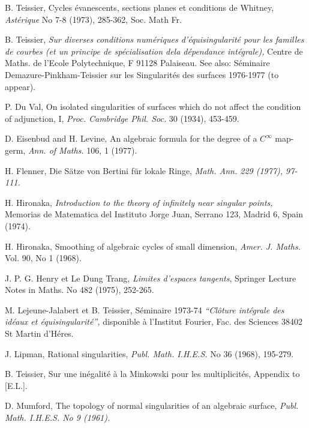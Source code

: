 \begin{thebibliography}{99}
 B. Teissier, Cycles \'evanescents, sections planes et conditions de Whitney, {\em Ast\'erique } No 7-8 (1973), 285-362, Soc. Math Fr.

 B. Teissier, {\em Sur diverses conditions num\'eriques d'\'equisingularit\'e pour les familles de courbes (et un principe de sp\'ecialisation de\pageoriginale la d\'ependance int\'egrale),} Centre de Maths. de l'Ecole Polytechnique, F 91128 Palaiseau. See also: S\'eminaire Demazure-Pinkham-Teissier sur les Singularit\'es des surfaces 1976-1977 (to appear).

 P. Du Val, On isolated singularities of surfaces which do not affect the condition of adjunction, I, {\em Proc. Cambridge Phil. Soc. }  30 (1934), 453-459.


 D. Eisenbud and H. Levine, An algebraic formula for the degree of a $C^\infty$ map-germ, {\em Ann. of Maths.} 106, 1 (1977).

 H. Flenner, Die S\"atze von Bertini f\"ur lokale Ringe, {\em Math. Ann. 229 (1977), 97-111.}

 H. Hironaka, {\em Introduction to the theory of infinitely near singular points, } Memorias de Matematica del Instituto Jorge Juan, Serrano 123, Madrid 6, Spain (1974).

 H. Hironaka, Smoothing of algebraic cycles of small dimension, {\em Amer. J. Maths.} Vol. 90, No 1 (1968).

 J. P. G. Henry et Le Dung Trang, {\em Limites d'espaces tangents}, Springer Lecture Notes in Maths. No 482 (1975), 252-265.


 M. Lejeune-Jalabert et B. Teissier, S\'eminaire 1973-74 {\em ``Cl\^oture int\'egrale des id\'eaux et \'equisingularit\'e'',} disponible \`a l'Institut Fourier, Fac. des Sciences 38402 St Martin d'H\'eres.

 J. Lipman, Rational singularities, {\em Publ. Math. I.H.E.S.} No 36 (1968), 195-279.

 B. Teissier, Sur une in\'egalit\'e \`a la Minkowski pour les multiplicit\'es, Appendix to [E.L.].

 D. Mumford, The topology of normal singularities of an algebraic surface, {\em Publ. Math. I.H.E.S. No 9 (1961).}


\end{thebibliography}
